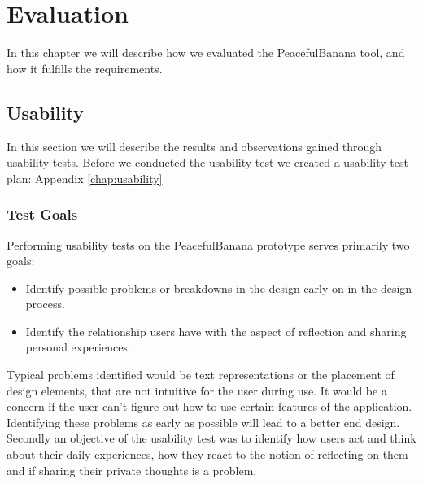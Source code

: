 \chapter{Evaluation}
In this chapter we will describe how we evaluated the PeacefulBanana tool, and how it fulfills the requirements.



\section{Usability}
In this section we will describe the results and observations gained through usability tests. Before we conducted the usability test we created a usability test plan: Appendix \ref{chap:usability}

\subsection{Test Goals}
Performing usability tests on the PeacefulBanana prototype serves primarily two goals:
\begin{itemize}
\item Identify possible problems or breakdowns in the design\cite{ref:30} early on in the design process.
\item Identify the relationship users have with the aspect of reflection and sharing personal experiences.
\end{itemize}
Typical problems identified would be text representations or the placement of design elements, that are not intuitive for the user during use. It would be a concern if the user can't figure out how to use certain features of the application. Identifying these problems as early as possible will lead to a better end design. \\
Secondly an objective of the usability test was to identify how users act and think about their daily experiences, how they react to the notion of reflecting on them and if sharing their private thoughts is a problem. 

